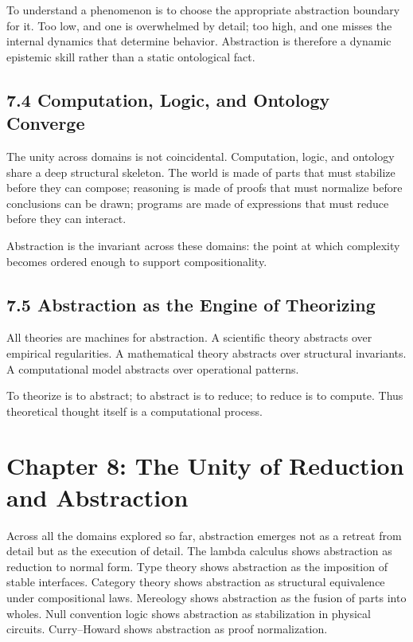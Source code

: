 \documentclass[12pt,letterpaper]{article}
\begin{document}
To understand a phenomenon is to choose the appropriate abstraction boundary for it. Too low, and one is overwhelmed by detail; too high, and one misses the internal dynamics that determine behavior. Abstraction is therefore a dynamic epistemic skill rather than a static ontological fact.

\subsection{7.4 Computation, Logic, and Ontology Converge}

The unity across domains is not coincidental. Computation, logic, and ontology share a deep structural skeleton. The world is made of parts that must stabilize before they can compose; reasoning is made of proofs that must normalize before conclusions can be drawn; programs are made of expressions that must reduce before they can interact.

Abstraction is the invariant across these domains: the point at which complexity becomes ordered enough to support compositionality.

\subsection{7.5 Abstraction as the Engine of Theorizing}

All theories are machines for abstraction. A scientific theory abstracts over empirical regularities. A mathematical theory abstracts over structural invariants. A computational model abstracts over operational patterns.

To theorize is to abstract; to abstract is to reduce; to reduce is to compute. Thus theoretical thought itself is a computational process.

\newpage

\section{Chapter 8: The Unity of Reduction and Abstraction}

Across all the domains explored so far, abstraction emerges not as a retreat from detail but as the execution of detail. The lambda calculus shows abstraction as reduction to normal form. Type theory shows abstraction as the imposition of stable interfaces. Category theory shows abstraction as structural equivalence under compositional laws. Mereology shows abstraction as the fusion of parts into wholes. Null convention logic shows abstraction as stabilization in physical circuits. Curry--Howard shows abstraction as proof normalization.
\end{document}
